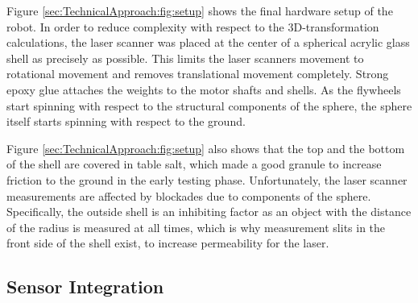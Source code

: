 Figure \ref{sec:TechnicalApproach:fig:setup} shows the final hardware setup of the robot.
In order to reduce complexity with respect to the 3D-transformation calculations, the laser scanner was placed at the center of a spherical acrylic glass shell as precisely as possible.
This limits the laser scanners movement to rotational movement and removes translational movement completely. 
Strong epoxy glue attaches the weights to the motor shafts and shells.
As the flywheels start spinning with respect to the structural components of the sphere, the sphere itself starts spinning with respect to the ground. 

Figure \ref{sec:TechnicalApproach:fig:setup} also shows that the top and the bottom of the shell are covered in table salt, which made a good granule to increase friction to the ground in the early testing phase. 
Unfortunately, the laser scanner measurements are affected by blockades due to components of the sphere.
Specifically, the outside shell is an inhibiting factor as an object with the distance of the radius is measured at all times, which is why measurement slits  in the front side of the shell exist, to increase permeability for the laser.
                                                                                                                                                                                                                 
\subsection{Sensor Integration}
\label{sec:TechnicalApproach:sensorintegration}

